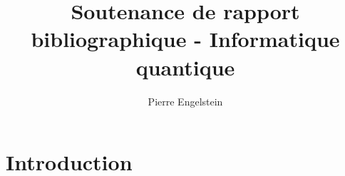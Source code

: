 \documentclass{beamer}
\title{Soutenance de rapport bibliographique - Informatique quantique}
\author{Pierre Engelstein}
\institute{Polytech Angers}
\begin{document}

\frame{\titlepage}








% 


\section{Introduction}
\end{document}
